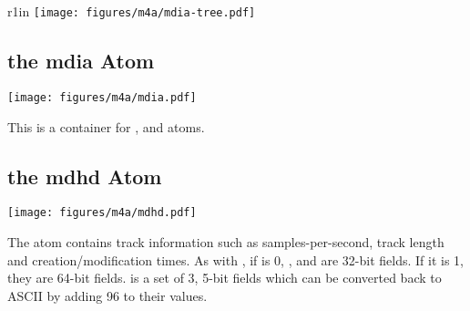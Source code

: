 \clearpage

\begin{wrapfigure}[5]{r}{1in}
  \texttt{[image: figures/m4a/mdia-tree.pdf]}
\end{wrapfigure}
\begin{minipage}[t]{4.75in}
\subsection{the mdia Atom}
\label{atom:mdia}
\texttt{[image: figures/m4a/mdia.pdf]}
\par
\noindent
This is a container for \hyperref[atom:mdhd]{},
\hyperref[atom:hdlr]{} and
\hyperref[atom:minf]{} atoms.

\subsection{the mdhd Atom}
\label{atom:mdhd}
\texttt{[image: figures/m4a/mdhd.pdf]}
\par
\noindent
The  atom contains track information such as samples-per-second,
track length and creation/modification times.
As with , if  is 0, ,
 and  are 32-bit fields.
If it is 1, they are 64-bit fields.
 is a set of 3, 5-bit fields which can be converted
back to ASCII by adding 96 to their values.
\end{minipage}

\clearpage

